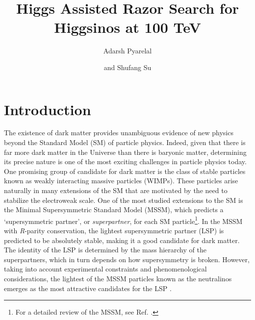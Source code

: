 \documentclass[a4paper,11pt]{article}
\title{Higgs Assisted Razor Search for Higgsinos at 100 TeV}
\author[a]{Adarsh Pyarelal}
\author[b]{and Shufang Su}
\affiliation[a]{School of Information, University of Arizona, Tucson, AZ 85718 , USA}
\affiliation[b]{Department of Physics, University of Arizona, Tucson, AZ 85718, USA}
\begin{document}
 
\maketitle
\flushbottom

\section{Introduction}
 
The existence of dark matter provides unambiguous evidence of new 
physics beyond the Standard Model (SM) of particle physics. Indeed, 
given that there is far more dark matter in the Universe than there 
is baryonic matter, determining its precise nature is one of the most 
exciting challenges in particle physics today.  One promising group 
of candidate for dark matter is the class of stable particles known as 
weakly interacting massive particles (WIMPs). These particles arise 
naturally in many extensions of the SM that are motivated by the need to
stabilize the electroweak scale. One of the most studied extensions
to the SM is the Minimal Supersymmetric Standard Model
(MSSM), which predicts a `supersymmetric partner', or \emph{superpartner}, 
for each SM particle\footnote{For a detailed review of the MSSM, see 
Ref. \citep{Martin:1997ns}.}. In the MSSM with \emph{R}-parity conservation, the 
lightest supersymmetric partner (LSP) is predicted to be absolutely 
stable, making it a good candidate for dark matter. The identity of 
the LSP is determined by the mass hierarchy of the superpartners, 
which in turn depends on how supersymmetry is broken.
However, taking into account experimental constraints and phenomenological 
considerations, the lightest of the  MSSM particles known as the 
neutralinos emerges as the most attractive candidates for the LSP \citep{Bertone:2004pz}. 
\end{document}
